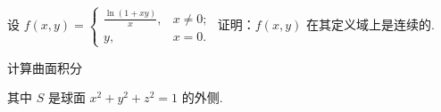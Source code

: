 \par{}
设 $f(x, y) = \begin{cases} \frac{\ln(1 + xy)}{x}, & x \neq 0; \\ y, & x = 0. \end{cases}$ 证明：$f(x, y)$ 在其定义域上是连续的.\par
\par{}
\par{}
计算曲面积分\par
\nopagebreak[4]
其中 $S$ 是球面 $x^{2} + y^{2} + z^{2} = 1$ 的外侧.\par
